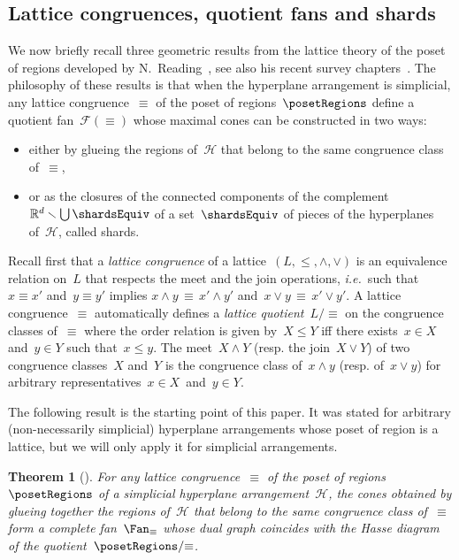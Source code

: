 \documentclass{amsart}
\newtheorem{theorem}{Theorem}%
\theoremstyle{definition}
\newcommand{\R}{\mathbb{R}} %
\newcommand{\ssm}{\smallsetminus} %
\newcommand{\ie}{\textit{i.e.}~} %
\newcommand{\darkblue}{\color{darkblue}} %
\newcommand{\defn}[1]{\textsl{\darkblue #1}} %
\newcommand{\meet}{\wedge} %
\newcommand{\join}{\vee} %
\newcommand{\arrangement}{\mathcal{H}} %
\newcommand{\fanEquiv}{\mathcal{F}(\equiv)} %
\begin{document}
\subsection{Lattice congruences, quotient fans and shards}
\label{subsec:latticeQuotients}

We now briefly recall three geometric results from the lattice theory of the poset of regions developed by N.~Reading~\cite{Reading-posetRegions}, see also his recent survey chapters~\cite{Reading-PosetRegionsChapter}.
The philosophy of these results is that when the hyperplane arrangement is simplicial, any lattice congruence~$\equiv$ of the poset of regions~$\posetRegions$ define a quotient fan~$\fanEquiv$ whose maximal cones can be constructed in two ways:
\begin{itemize}
\item either by glueing the regions of~$\arrangement$ that belong to the same congruence class of~$\equiv$,
\item or as the closures of the connected components of the complement~$\R^d \ssm \bigcup \shardsEquiv$ of a set~$\shardsEquiv$ of pieces of the hyperplanes of~$\arrangement$, called shards.
\end{itemize}

Recall first that a \defn{lattice congruence} of a lattice~$(L,\le,\meet,\join)$ is an equivalence relation on~$L$ that respects the meet and the join operations, \ie such that $x \equiv x'$ and~$y \equiv y'$ implies $x \meet y \, \equiv \, x' \meet y'$ and~$x \join y \, \equiv \, x' \join y'$. A lattice congruence~$\equiv$ automatically defines a \defn{lattice quotient}~$L/{\equiv}$ on the congruence classes of~$\equiv$ where the order relation is given by~$X \le Y$ iff there exists~$x \in X$ and~$y \in Y$ such that~$x \le y$. The meet~$X \meet Y$ (resp. the join~$X \join Y$) of two congruence classes~$X$ and~$Y$ is the congruence class of~$x \meet y$ (resp. of~$x \join y$) for arbitrary representatives~$x \in X$~and~$y \in Y$.

The following result is the starting point of this paper.
It was stated for arbitrary (non-necessarily simplicial) hyperplane arrangements whose poset of region is a lattice, but we will only apply it for simplicial arrangements.

\begin{theorem}[{\cite[Thm.~5.1]{Reading-HopfAlgebras}}]
\label{thm:fanQuotient}
For any lattice congruence~$\equiv$ of the poset of regions~$\posetRegions$ of a simplicial hyperplane arrangement~$\arrangement$, the cones obtained by glueing together the regions of~$\arrangement$ that belong to the same congruence class of~$\equiv$ form a complete fan~$\Fan_\equiv$ whose dual graph coincides with the Hasse diagram of the quotient~$\posetRegions/{\equiv}$.
\end{theorem}
\end{document}
